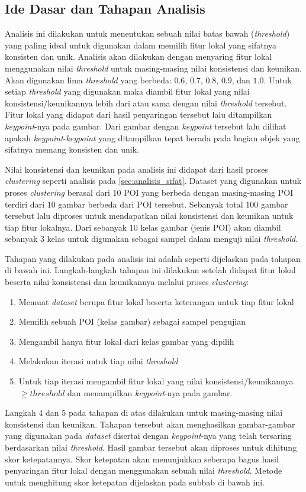 \subsection{Ide Dasar dan Tahapan Analisis}
\label{subsec:ide_tahapan_analisis_threshold}
Analisis ini dilakukan untuk menentukan sebuah nilai batas bawah (\textit{threshold}) yang paling ideal untuk digunakan dalam memilih fitur lokal yang sifatnya konsisten dan unik. Analisis akan dilakukan dengan menyaring fitur lokal menggunakan nilai \textit{threshold} untuk masing-masing nilai konsistensi dan keunikan. Akan digunakan lima \textit{threshold} yang berbeda: $0.6$, $0.7$, $0.8$, $0.9$, dan $1.0$. Untuk setiap \textit{threshold} yang digunakan maka diambil fitur lokal yang nilai konsistensi/keunikannya lebih dari atau sama dengan nilai \textit{threshold} tersebut. Fitur lokal yang didapat dari hasil penyaringan tersebut lalu ditampilkan \textit{keypoint}-nya pada gambar. Dari gambar dengan \textit{keypoint} tersebut lalu dilihat apakah \textit{keypoint}-\textit{keypoint} yang ditampilkan tepat berada pada bagian objek yang sifatnya memang konsisten dan unik.

Nilai konsistensi dan keunikan pada analisis ini didapat dari hasil proses \textit{clustering} seperti analisis pada \ref{sec:analisis_sifat}. Dataset yang digunakan untuk proses \textit{clustering} berasal dari 10 POI yang berbeda dengan masing-masing POI terdiri dari 10 gambar berbeda dari POI tersebut. Sebanyak total 100 gambar tersebut lalu diproses untuk mendapatkan nilai konsistensi dan keunikan untuk tiap fitur lokalnya. Dari sebanyak 10 kelas gambar (jenis POI) akan diambil sebanyak 3 kelas untuk digunakan sebagai sampel dalam menguji nilai \textit{threshold}.

Tahapan yang dilakukan pada analisis ini adalah seperti dijelaskan pada tahapan di bawah ini. Langkah-langkah tahapan ini dilakukan setelah didapat fitur lokal beserta nilai konsistensi dan keunikannya melalui proses \textit{clustering}:
\begin{enumerate}
	\item Memuat \textit{dataset} berupa fitur lokal beserta keterangan untuk tiap fitur lokal
	\item Memilih sebuah POI (kelas gambar) sebagai sampel pengujian 
	\item Mengambil hanya fitur lokal dari kelas gambar yang dipilih
	\item Melakukan iterasi untuk tiap nilai \textit{threshold}
	\item Untuk tiap iterasi mengambil fitur lokal yang nilai konsistensi/keunikannya $\geq {threshold}$ dan menampilkan \textit{keypoint}-nya pada gambar.
\end{enumerate}
Langkah 4 dan 5 pada tahapan di atas dilakukan untuk masing-masing nilai konsistensi dan keunikan. Tahapan tersebut akan menghasilkan gambar-gambar yang digunakan pada \textit{dataset} disertai dengan \textit{keypoint}-nya yang telah tersaring berdasarkan nilai \textit{threshold}. Hasil gambar tersebut akan diproses untuk dihitung skor ketepatannya. Skor ketepatan akan menunjukkan seberapa bagus hasil penyaringan fitur lokal dengan menggunakan sebuah nilai \textit{threshold}. Metode untuk menghitung skor ketepatan dijelaskan pada subbab di bawah ini.

